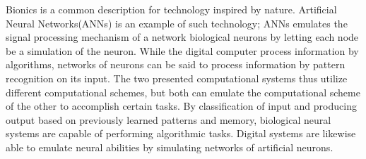 	Bionics is a common description for technology inspired by nature\cite{CITE}. %
	Artificial Neural Networks(ANNs) is an example of such technology;
		ANNs emulates the signal processing mechanism of a network biological neurons by letting each node be a simulation of the neuron\cite{CITE}. %
	While the digital computer process information by algorithms, networks of neurons can be said to process information by 
		pattern recognition on its input\cite{CITE}. %
	The two presented computational systems thus utilize different computational schemes, 
		but both can emulate the computational scheme of the other to accomplish certain tasks. %
	By classification of input and producing output based on previously learned patterns and memory, biological neural systems are capable of performing algorithmic tasks. %
	Digital systems are likewise able to emulate neural abilities by simulating networks of artificial neurons\cite{CITE}. %


